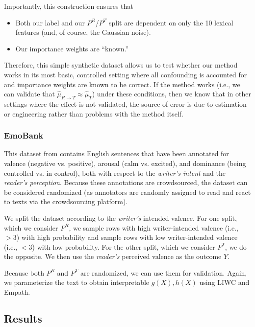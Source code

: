 \documentclass{article}
\begin{document}
Importantly, this construction ensures that
\begin{itemize}
    \item Both our label and our $P^R$/$P^T$ split are dependent on only the 10 lexical features (and, of course, the Gaussian noise).
    \item Our importance weights are ``known.'' 
\end{itemize}

Therefore, this simple synthetic dataset allows us to test whether our method works in its most basic, controlled setting where all confounding is accounted for and importance weights are known to be correct. If the method works (i.e., we can validate that $\hat{\mu}_{R \rightarrow T} \approx \hat{\mu}_T$) under these conditions, then we know that in other settings where the effect is not validated, the source of error is due to estimation or engineering rather than problems with the method itself.

\subsubsection{EmoBank}
\label{sec:emobank_data_description}

This dataset from \cite{buechel2017emobank} contains English sentences that have been annotated for valence (negative vs. positive), arousal (calm vs. excited), and dominance (being controlled vs. in control), both with respect to the \textit{writer's intent} and the \textit{reader's perception}. Because these annotations are crowdsourced, the dataset can be considered randomized (as annotators are randomly assigned to read and react to texts via the crowdsourcing platform).

We split the dataset according to the \textit{writer's} intended valence. For one split, which we consider $P^R$, we sample rows with high writer-intended valence (i.e., $>3$) with high probability and sample rows with low writer-intended valence (i.e., $<3$) with low probability. For the other split, which we consider $P^T$, we do the opposite. We then use the \textit{reader's} perceived valence as the outcome $Y$.

Because both $P^R$ and $P^T$ are randomized, we can use them for validation. Again, we parameterize the text to obtain interpretable $g(X), h(X)$ using LIWC and Empath.

\subsection{Results}
\end{document}

